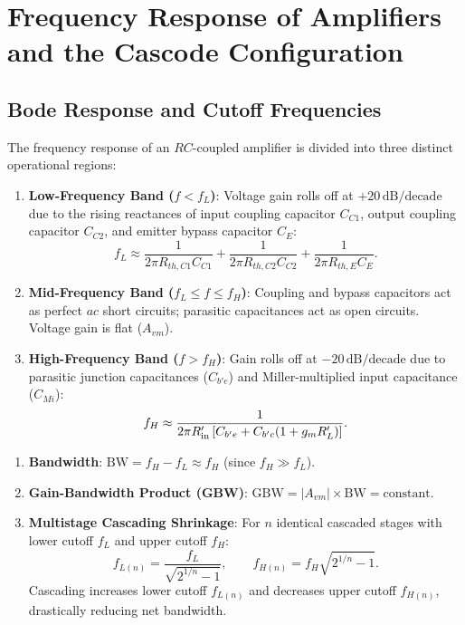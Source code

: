 \documentclass[12pt,a4paper]{article}
\begin{document}
\section{Frequency Response of Amplifiers and the Cascode Configuration}

\subsection{Bode Response and Cutoff Frequencies}
The frequency response of an $RC$-coupled amplifier is divided into three distinct operational regions:
\begin{enumerate}[leftmargin=1.5em, itemsep=2pt]
  \item \textbf{Low-Frequency Band ($f < f_L$)}: Voltage gain rolls off at $+20\,\mathrm{dB/decade}$ due to the rising reactances of input coupling capacitor $C_{C1}$, output coupling capacitor $C_{C2}$, and emitter bypass capacitor $C_E$:
  \[
  f_L \approx \frac{1}{2\pi R_{th,C1} C_{C1}} + \frac{1}{2\pi R_{th,C2} C_{C2}} + \frac{1}{2\pi R_{th,E} C_E}.
  \]
  \item \textbf{Mid-Frequency Band ($f_L \le f \le f_H$)}: Coupling and bypass capacitors act as perfect $ac$ short circuits; parasitic capacitances act as open circuits. Voltage gain is flat ($A_{vm}$).
  \item \textbf{High-Frequency Band ($f > f_H$)}: Gain rolls off at $-20\,\mathrm{dB/decade}$ due to parasitic junction capacitances ($C_{b'e}$) and Miller-multiplied input capacitance ($C_{Mi}$):
  \[
  f_H \approx \frac{1}{2\pi R_{\rm in}' \left[C_{b'e} + C_{b'c}(1 + g_m R_L')\right]}.
  \]
\end{enumerate}

\begin{tcolorbox}[formulabox, title={Bandwidth and Multistage Shrinkage Factors}]
\begin{enumerate}[leftmargin=1.5em, itemsep=2pt]
  \item \textbf{Bandwidth}: $\mathrm{BW} = f_H - f_L \approx f_H$ (since $f_H \gg f_L$).
  \item \textbf{Gain-Bandwidth Product (GBW)}: $\mathrm{GBW} = |A_{vm}| \times \mathrm{BW} = \mathrm{constant}$.
  \item \textbf{Multistage Cascading Shrinkage}: For $n$ identical cascaded stages with lower cutoff $f_L$ and upper cutoff $f_H$:
  \[
  f_{L(n)} = \frac{f_L}{\sqrt{2^{1/n} - 1}},\qquad
  f_{H(n)} = f_H \sqrt{2^{1/n} - 1}.
  \]
  Cascading increases lower cutoff $f_{L(n)}$ and decreases upper cutoff $f_{H(n)}$, drastically reducing net bandwidth.
\end{enumerate}
\end{tcolorbox}
\end{document}

